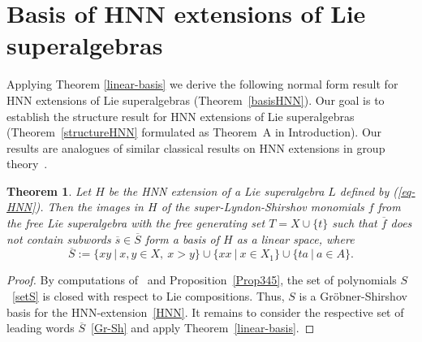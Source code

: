 \documentclass[12pt, reqno]{amsart}
\newtheorem{theorem}{Theorem}[section]
\theoremstyle{remark}
\theoremstyle{definition}
\numberwithin{equation}{section}
\begin{document}

\section{ Basis of HNN extensions of Lie superalgebras}
Applying  Theorem \ref{linear-basis} we derive 
the following normal form result for HNN extensions of Lie superalgebras (Theorem~\ref{basisHNN}).
Our goal is to establish the structure result for HNN extensions  of Lie superalgebras (Theorem~\ref{structureHNN} formulated as Theorem~A in Introduction).
Our results are analogues of similar classical results on HNN extensions in group theory~\cite{LyndonShupp}.


\begin{theorem} \label{shirshov} Let $H$ be the HNN extension of {a Lie  superalgebra $L$} defined by (\ref{eq-HNN}).
Then the images  in $H$ of the super-Lyndon-Shirshov monomials $f$  from the free Lie  superalgebra with the free generating 
set $T = X \cup \{ t \}$ such that $\overline{f}$ does not contain 
subwords $\overline{s}\in \overline S$ form a basis of $H$ as a linear space,  where 
\begin{equation}\label{Gr-Sh}
 \overline{S}  := \{ xy \ | \ x, y \in X,\ x > y \} \cup \{ xx \ | \ x \in X_1 \} \cup \{ ta  \ | \ a \in A \}.
\end{equation}
\end{theorem}
\begin{proof} By computations of~\cite{L-P-Z} and Proposition~\eqref{Prop345}, the set of polynomials $S$~\eqref{setS} is closed with respect to Lie compositions. 
Thus, $S$ is a Gr\"obner-Shirshov basis for the HNN-extension~\eqref{HNN}.
It remains to consider the respective set of leading words $\overline S$~\eqref{Gr-Sh} and apply Theorem~\ref{linear-basis}.
\end{proof}
\end{document}
